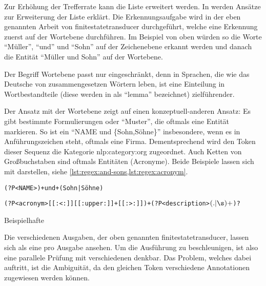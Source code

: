 Zur Erhöhung der Trefferrate
kann die Liste erweitert werden.
In \autocite[Abschnitt 3.4]{OASIcs-LDK-2019-11}
werden Ansätze zur Erweiterung der Liste erklärt.
Die Erkennungsaufgabe wird in der eben genannten Arbeit
von \gls{finitestatetransducer}
durchgeführt,
welche eine Erkennung zuerst auf der Wortebene durchführen.
Im Beispiel von oben würden so die Worte
\enquote{Müller}, \enquote{und} und \enquote{Sohn} auf der Zeichenebene erkannt werden
und danach die Entität \enquote{Müller und Sohn} auf der Wortebene.

Der Begriff Wortebene passt nur eingeschränkt,
denn in Sprachen,
die wie das Deutsche von zusammengesetzen Wörtern leben,
ist eine Einteilung in Wortbestandteile
(diese werden in \autocite{OASIcs-LDK-2019-11} als \foreignquote{english}{lemma} bezeichnet)
zielführender.

Der Ansatz mit der Wortebene zeigt auf einen konzeptuell-anderen Ansatz:
Es gibt bestimmte Formulierungen oder \enquote{Muster},
die oftmals eine Entität markieren.
So ist ein \enquote{NAME und \{Sohn,Söhne\}} insbesondere,
wenn es in Anführungszeichen steht,
oftmals eine Firma.
Dementsprechend wird den Token dieser Sequenz
die Kategorie \gls{nlp:category:org} zugeordnet.
Auch Ketten von Großbuchstaben sind oftmals Entitäten (Acronyme).
Beide Beispiele lassen sich mit  darstellen,
siehe \cref{lst:regex:and-sons,lst:regex:acronym}.

\begin{listing}
	\begin{minipage}{\linewidth}
		\begin{tcolorbox}[tlistingstyle]
			\texttt{(?P<NAME>\w*)\s+und\s+(Sohn|Söhne)}
		\end{tcolorbox}
		\label{lst:regex:and-sons}
	\end{minipage}
	\begin{minipage}{\linewidth}
		\begin{tcolorbox}[tlistingstyle]
			\texttt{(?P<acronym>[[:<:]][[:upper:]]+[[:>:]])\s+(?P<description>\((.|\s)+\))?}
		\end{tcolorbox}
		\label{lst:regex:acronym}
	\end{minipage}
	\caption{Beispielhafte }
\end{listing} %

Die verschiedenen Ausgaben,
der oben genannten \gls{finitestatetransducer},
lassen sich als eine  pro Ausgabe ansehen.
Um die Ausführung zu beschleunigen,
ist also eine parallele Prüfung mit verschiedenen  denkbar.
Das Problem,
welches dabei auftritt,
ist die Ambiguität,
da den gleichen Token verschiedene Annotationen zugewiesen werden können.

